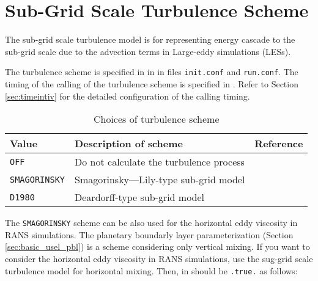 
\section{Sub-Grid Scale Turbulence Scheme} \label{sec:basic_usel_turbulence}

The sub-grid scale turbulence model is for representing energy cascade to the sub-grid scale due to the advection terms in Large-eddy simulations (LESs).


The turbulence scheme is specified in  in  in files \verb|init.conf| and \verb|run.conf|. The timing of the calling of the turbulence scheme is specified in . Refer to Section \ref{sec:timeintiv} for the detailed configuration of the calling timing.

\begin{table}[h]
\begin{center}
  \caption{Choices of turbulence scheme}
  \label{tab:nml_atm_tb}
  \begin{tabularx}{150mm}{lXX} \hline
    \rowcolor[gray]{0.9}  Value & Description of scheme & Reference\\ \hline
      \verb|OFF|          & Do not calculate the turbulence process &  \\
      \verb|SMAGORINSKY|  & Smagorinsky—Lily-type sub-grid model & \citet{smagorinsky_1963,lilly_1962,Brown_etal_1994,Scotti_1993} \\
      \verb|D1980|        & Deardorff-type sub-grid model & \citet{Deardorff_1980} \\
    \hline
  \end{tabularx}
\end{center}
\end{table}

The \verb|SMAGORINSKY| scheme can be also used for the horizontal eddy viscosity in RANS simulations.
The planetary boundarly layer parameterization (Section \ref{sec:basic_usel_pbl}) is a scheme considering only vertical mixing.
If you want to consider the horizontal eddy viscosity in RANS simulations,
use the sug-grid scale turbulence model for horizontal mixing.
Then,  in  should be \verb|.true.| as follows:
